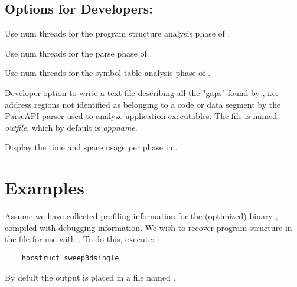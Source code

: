 \documentclass[english]{article}
\begin{document}
\subsection{Options for Developers:}

\begin{Description}
\item[\OptArg{--jobs-struct}{num}]
Use num threads for the program structure analysis phase of .

\item[\OptArg{--jobs-parse}{num}]
Use num threads for the parse phase of .

\item[\OptArg{--jobs-symtab}{num}]
Use num threads for the symbol table analysis phase of .

\item[\Opt{--show-gaps}]
Developer option to
write a text file describing all the "gaps" found by ,
i.e. address regions not identified as belonging to a code or data segment
by the ParseAPI parser used to analyze application executables.
The file is named \emph{outfile}, which by default is
\emph{appname}.

\item[\Opt{--time}]
Display the time and space usage per phase in .

\end{Description}



\section{Examples}

Assume we have collected profiling information for the (optimized) binary ,
compiled with debugging information.
We wish to recover program structure in the file 
for use with .
To do this, execute:

\begin{verbatim}
    hpcstruct sweep3dsingle
\end{verbatim}

By defult the output is placed in a file named .
\end{document}
